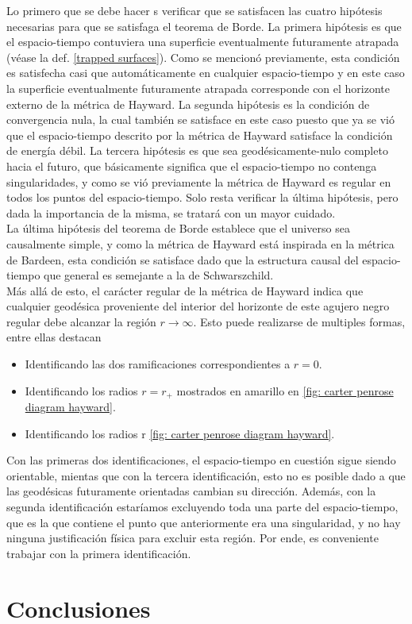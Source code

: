 \documentclass[16pt,a4paper]{article}
\numberwithin{equation}{section}
\theoremstyle{definition}
\begin{document}
Lo primero que se debe hacer s verificar que se satisfacen las cuatro hipótesis necesarias para que se satisfaga el teorema de Borde. La primera hipótesis es que el espacio-tiempo contuviera una superficie eventualmente futuramente atrapada (véase la def. \ref*{trapped surfaces}). Como se mencionó previamente, esta condición es satisfecha casi que automáticamente en cualquier espacio-tiempo y en este caso la superficie eventualmente futuramente atrapada corresponde con el horizonte externo de la métrica de Hayward. La segunda hipótesis es la condición de convergencia nula, la cual también se satisface en este caso puesto que ya se vió que el espacio-tiempo descrito por la métrica de Hayward satisface la condición de energía débil. La tercera hipótesis es que sea geodésicamente-nulo completo hacia el futuro, que básicamente significa que el espacio-tiempo no contenga singularidades, y como se vió previamente la métrica de Hayward es regular en todos los puntos del espacio-tiempo. Solo resta verificar la última hipótesis, pero dada la importancia de la misma, se tratará con un mayor cuidado.\\

La última hipótesis del teorema de Borde establece que el universo sea causalmente simple, y como la métrica de Hayward está inspirada en la métrica de Bardeen, esta condición se satisface dado que la estructura causal del espacio-tiempo que general es semejante a la de Schwarszchild.\\

Más allá de esto, el carácter regular de la métrica de Hayward indica que cualquier geodésica proveniente del interior del horizonte de este agujero negro regular debe alcanzar la región $r \to \infty$. Esto puede realizarse de multiples formas, entre ellas destacan

\begin{itemize}
\item Identificando las dos ramificaciones correspondientes a $r = 0$.

\item Identificando los radios $r = r_+$ mostrados en amarillo en \ref{fig: carter penrose diagram hayward}.

\item Identificando los radios r \ref{fig: carter penrose diagram hayward}.
\end{itemize}

Con las primeras dos identificaciones, el espacio-tiempo en cuestión sigue siendo orientable, mientas que con la tercera identificación, esto no es posible dado a que las geodésicas  futuramente orientadas cambian su dirección. Además, con la segunda identificación estaríamos excluyendo toda una parte del espacio-tiempo, que es la que contiene el punto que anteriormente era una singularidad, y no hay ninguna justificación física para excluir esta región. Por ende, es conveniente trabajar con la primera identificación.
\newpage
\section{\label{conclusions} Conclusiones}

\newpage


\end{document}
